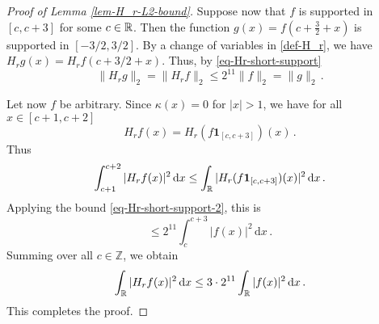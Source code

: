 {\begin{proof}[Proof of Lemma \ref{lem-H_r-L2-bound}]
    Suppose now that $f$ is supported in $[c, c+3]$ for some $c \in {\mathbb{R}}$. Then the function $g(x) = f(c+ \frac{3}{2} +x)$ is supported in $[-3/2,3/2]$. By a change of variables in \eqref{def-H_r}, we have $H_r g(x ) = H_r f(c+ 3/2+x)$. Thus, by \eqref{eq-Hr-short-support}
    \begin{equation}
        \label{eq-Hr-short-support-2}
        \|H_rg\|_2 = \|H_r f\|_2 \le 2^{11} \|f\|_2 = \|g\|_2\,.
    \end{equation}

    Let now $f$ be arbitrary.
    Since $\kappa(x) = 0$ for $|x| > 1$, we have for all $x \in [c+1, c+2]$
    $$
        H_rf(x) = H_r(f \mathbf{1}_{[c, c+3]})(x)\,.
    $$
    Thus
    $$
        \int_{c+1}^{c+2} |H_r f(x)|^2 \, \mathrm{d}x \le \int_{{\mathbb{R}}} |H_r(f \mathbf{1}_{[c, c+3]})(x)|^2 \, \mathrm{d}x\,.
    $$
    Applying the bound \eqref{eq-Hr-short-support-2}, this is
    $$
        \le 2^{11} \int_{c}^{c+3} |f(x)|^2 \, \mathrm{d}x\,.
    $$
    Summing over all $c \in \mathbb{Z}$, we obtain
    $$
        \int_{{\mathbb{R}}} |H_rf(x)|^2 \, \mathrm{d}x \le 3 \cdot 2^{11} \int_{{\mathbb{R}}} |f(x)|^2 \, \mathrm{d}x\,.
    $$
    This completes the proof.
\end{proof}


}
